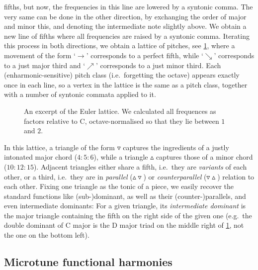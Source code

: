 \documentclass[british,11pt]{scrartcl}
\begin{document}
fifths, but now, the frequencies in this line are lowered by a syntonic comma.
The very same can be done in the other direction, by exchanging the order of
major and minor this, and denoting the intermediate note slightly above.  We
obtain a new line of fifths where all frequencies are raised by a syntonic
comma. Iterating this process in both directions, we obtain a lattice of
pitches, see \cref{fig:latticeExcerpt}, where a movement of the form ‘$\to$’
corresponds to a perfect fifth, while ‘$\searrow$’ corresponds to a just major
third and ‘$\nearrow$’ corresponds to a just minor third. Each
(enharmonic-sensitive) pitch class (i.e.\ forgetting the octave) appears exactly
once in each line, so a vertex in the lattice is the same as a pitch class,
together with a number of syntonic commata applied to it.

\begin{figure}[h]
  
  \caption{An excerpt of the Euler lattice. We calculated all frequences as
    factors relative to C, octave-normalised so that they lie between $1$ and
    $2$.}\label{fig:latticeExcerpt}
\end{figure}

In this lattice, a triangle of the form $\triangledown$ captures the ingredients
of a justly intonated major chord ($4:5:6$), while a triangle $\vartriangle$
captures those of a minor chord ($10:12:15$). Adjacent triangles either share a
fifth, i.e.\ they are \emph{variants} of each other, or a third, i.e.\ they are
in \emph{parallel} ($\vartriangle\!\!\!\triangledown$) or \emph{counterparallel}
($\triangledown\!\!\!\vartriangle$) relation to each other.  Fixing one triangle
as the tonic of a piece, we easily recover the standard functions like
(sub-)dominant, as well as their (counter-)parallels, and even intermediate
dominants: For a given triangle, its \emph{intermediate dominant} is the major
triangle containing the fifth on the right side of the given one (e.g.\ the
double dominant of C major is the D major triad on the middle right of
\cref{fig:latticeExcerpt}, not the one on the bottom left).

\subsection{Microtune functional harmonies}
\end{document}
